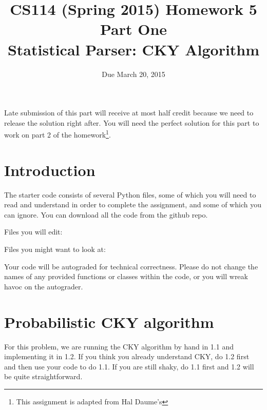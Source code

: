 \documentclass[11pt,letterpaper]{article}
\begin{document}
\title{CS114 (Spring 2015) Homework 5 Part One\\ Statistical Parser: CKY Algorithm}
\author{Due March 20, 2015}
\date{}
\maketitle

Late submission of this part will receive at most half credit because we need to release the solution right after. 
You will need the perfect solution for this part to work on part 2 of the homework\footnote{This assignment is adapted from Hal Daume's}.
\section*{Introduction}

The starter code consists of several Python files, some of which you will need to read and understand in order to complete the assignment, and some of which you can ignore. 
You can download all the code from the github repo.


Files you will edit:

Files you might want to look at:

Your code will be autograded for technical correctness. Please do not change the names of any provided functions or classes within the code, or you will wreak havoc on the autograder. 

\section{Probabilistic CKY algorithm}
For this problem, we are running the CKY algorithm by hand in 1.1 and implementing it in 1.2. If you think you already understand CKY, do 1.2 first and then use your code to do 1.1. 
If you are still shaky, do 1.1 first and 1.2 will be quite straightforward.
\end{document}
